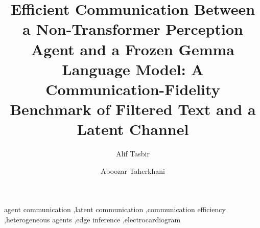 \documentclass[preprint,12pt]{elsarticle}
\begin{document}
\begin{frontmatter}

\title{Efficient Communication Between a Non-Transformer Perception Agent and a Frozen Gemma Language Model: A Communication-Fidelity Benchmark of Filtered Text and a Latent Channel}

\author[dmu]{Alif Tasbir}
\author[dmu]{Aboozar Taherkhani}



\begin{keyword}
agent communication \sep latent communication \sep communication efficiency \sep heterogeneous agents \sep edge inference \sep electrocardiogram
\end{keyword}

\end{frontmatter}










\small
\setlength{\bibsep}{1pt}


\end{document}
